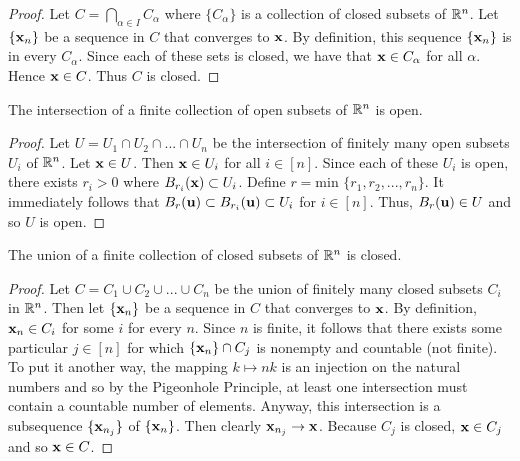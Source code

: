 \documentclass[letterpaper, twoside, 12pt]{book}
\begin{document}
\begin{proof}
    Let \(C = \bigcap_{\alpha \in I} C_\alpha\) where \(\{C_\alpha\}\) is
    a collection of closed subsets of \(\mathbb R^n\). Let \(\{\mathbf x_n\}\)
    be a sequence in \(C\) that converges to \(\mathbf x\). By definition,
    this sequence \(\{\mathbf x_n\}\) is in every \(C_\alpha\). Since 
    each of these sets is closed, we have that \(\mathbf x \in C_\alpha\)
    for all \(\alpha\). Hence \(\mathbf x \in C\). Thus \(C\) is closed.
\end{proof}

\begin{proposition}[10.18.i]
  The intersection of a finite collection of
  open subsets of \(\mathbb R^n\) is open.
\end{proposition}

\begin{proof}
    Let \(U = U_1 \cap U_2 \cap ... \cap U_n\) be the intersection
    of finitely many open subsets \(U_i\) of \(\mathbb R^n\).
    Let \(\mathbf x \in U\). Then \(\mathbf x \in U_i\) for all \(i \in [n]\).
    Since each of these \(U_i\) is open, there exists \(r_i > 0\)
    where \(B_{r_i}(\mathbf x) \subset U_i\). Define 
    \(r = \text{min~}\{r_1, r_2, ..., r_n\}\). It immediately
    follows that \(B_{r}(\mathbf u) \subset B_{r_i}(\mathbf u) \subset U_i\)
    for \(i \in [n]\). Thus, \(B_{r}(\mathbf u) \in U\) and so \(U\)
    is open.
\end{proof}

\begin{proposition}[10.18.ii]
  The union of a finite collection of
  closed subsets of \(\mathbb R^n\) is closed.
\end{proposition}

\begin{proof}
    Let \(C = C_1 \cup C_2 \cup ... \cup C_n \) be the union
    of finitely many closed subsets \(C_i\) in \(\mathbb R^n\).
    Then let \(\{\mathbf x_n\}\) be a sequence in \(C\) that
    converges to \(\mathbf x\). By definition, \(\mathbf x_n \in C_i\)
    for some \(i\) for every \(n\). Since \(n\) is finite, it
    follows that there exists some particular \(j \in [n]\) for which
    \(\{\mathbf x_n\} \cap C_j \) is nonempty and countable (not finite). 
    To put it another way, the mapping \(k \mapsto nk\) is an injection
    on the natural numbers and so by the Pigeonhole Principle, at
    least one intersection must contain a countable number of elements.
    Anyway, this intersection is a subsequence \(\{\mathbf x_{n_j}\}\) of 
    \(\{\mathbf x_n\}\). Then clearly \(\mathbf x_{n_j} \to \mathbf x\). 
    Because \(C_j\) is closed, \(\mathbf x \in C_j\) and so \(\mathbf x \in C\).
\end{proof}
\end{document}

